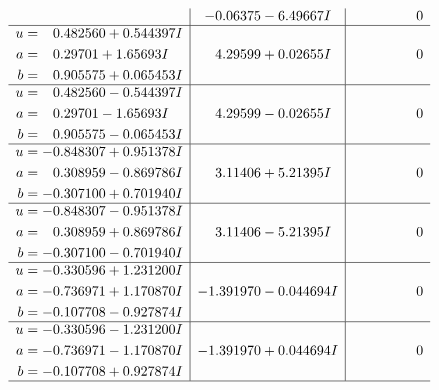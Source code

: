 \documentclass[1p]{elsarticle_modified}
\theoremstyle{definition}
\begin{document}
$$\begin{array}{c|c|c}
 & -0.06375 - 6.49667 I & \phantom{-0.000000 } 0 \\ \hline\begin{aligned}
u &= \phantom{-}0.482560 + 0.544397 I \\
a &= \phantom{-}0.29701 + 1.65693 I \\
b &= \phantom{-}0.905575 + 0.065453 I\end{aligned}
 & \phantom{-}4.29599 + 0.02655 I & \phantom{-0.000000 } 0 \\ \hline\begin{aligned}
u &= \phantom{-}0.482560 - 0.544397 I \\
a &= \phantom{-}0.29701 - 1.65693 I \\
b &= \phantom{-}0.905575 - 0.065453 I\end{aligned}
 & \phantom{-}4.29599 - 0.02655 I & \phantom{-0.000000 } 0 \\ \hline\begin{aligned}
u &= -0.848307 + 0.951378 I \\
a &= \phantom{-}0.308959 - 0.869786 I \\
b &= -0.307100 + 0.701940 I\end{aligned}
 & \phantom{-}3.11406 + 5.21395 I & \phantom{-0.000000 } 0 \\ \hline\begin{aligned}
u &= -0.848307 - 0.951378 I \\
a &= \phantom{-}0.308959 + 0.869786 I \\
b &= -0.307100 - 0.701940 I\end{aligned}
 & \phantom{-}3.11406 - 5.21395 I & \phantom{-0.000000 } 0 \\ \hline\begin{aligned}
u &= -0.330596 + 1.231200 I \\
a &= -0.736971 + 1.170870 I \\
b &= -0.107708 - 0.927874 I\end{aligned}
 & -1.391970 - 0.044694 I & \phantom{-0.000000 } 0 \\ \hline\begin{aligned}
u &= -0.330596 - 1.231200 I \\
a &= -0.736971 - 1.170870 I \\
b &= -0.107708 + 0.927874 I\end{aligned}
 & -1.391970 + 0.044694 I & \phantom{-0.000000 } 0\\
 \hline 
 \end{array}$$\newpage$$\begin{array}{c|c|c}  

\end{array}$$
\end{document}
